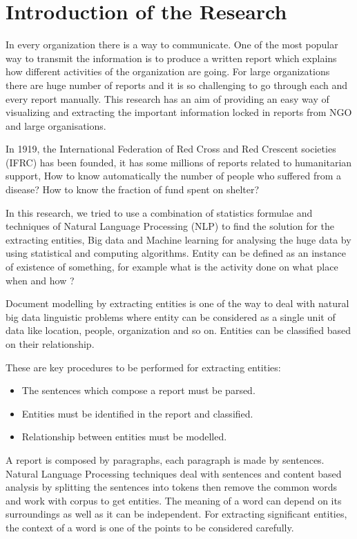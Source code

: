 \chapter{Introduction of the Research}

In every organization there is a way to communicate. One of the most popular way to transmit the information  is  to produce a written report which explains how different activities of the organization are going. For large organizations there are huge number of reports and it is so challenging to go through  each and every report manually.
This research has an aim of providing an easy way of visualizing and extracting the important information locked in reports from NGO and large organisations.

In 1919, the International Federation of Red Cross and Red Crescent societies (IFRC) has been founded, it has some millions of reports related to humanitarian support, How to  know automatically the number of people who suffered from a disease?  How to know the  fraction of fund spent on shelter?  

In this research, we tried to use a combination of statistics formulae  and techniques of Natural Language Processing (NLP) to find the solution for the extracting entities, 
Big data and Machine learning for analysing the huge data by using statistical and computing algorithms. Entity can be defined as an instance of existence of something, for example what is the activity done on what place when and how ?  

Document modelling by extracting entities is one of the way to deal with natural big data linguistic problems where entity can be considered as a single unit of data like location, people, organization and so on. Entities  can be classified based on their relationship.

These are key procedures to be performed for extracting entities: 
\begin{itemize}
\item The sentences which compose a report  must be parsed.
\item Entities must be identified in the report and classified.
\item Relationship between entities must be modelled.
\end{itemize}

A report is composed by  paragraphs, each paragraph is made by sentences. Natural  Language Processing techniques deal with sentences and content based analysis by splitting the sentences into tokens then remove the common words and work with corpus to get entities. The meaning of a word can depend on its surroundings as well as it can be independent. For extracting significant entities, the context of a word is one of the points to be considered carefully.